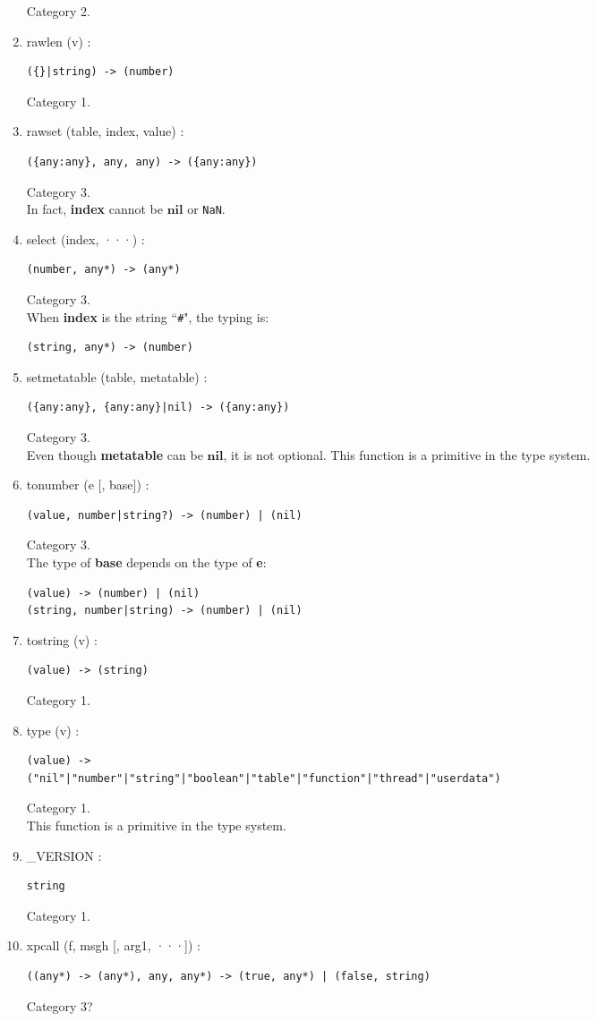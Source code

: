 \documentclass{paper}
\newcommand{\Nil}{\mathbf{nil}}
\begin{document}
\begin{enumerate}
Category 2.
\item rawlen (v) :
\begin{verbatim}
({}|string) -> (number)
\end{verbatim}
Category 1.
\item rawset (table, index, value) :
\begin{verbatim}
({any:any}, any, any) -> ({any:any})
\end{verbatim}
Category 3.
\\
In fact, \textbf{index} cannot be $\Nil$ or \texttt{NaN}.
\item select (index, ···) :
\begin{verbatim}
(number, any*) -> (any*)
\end{verbatim}
Category 3.
\\
When \textbf{index} is the string ``\texttt{\#}", the typing is:
\begin{verbatim}
(string, any*) -> (number)
\end{verbatim}
\item setmetatable (table, metatable) :
\begin{verbatim}
({any:any}, {any:any}|nil) -> ({any:any}) 
\end{verbatim}
Category 3.
\\
Even though \textbf{metatable} can be $\Nil$, it is not optional.
This function is a primitive in the type system.
\item tonumber (e [, base]) :
\begin{verbatim}
(value, number|string?) -> (number) | (nil)
\end{verbatim}
Category 3.
\\
The type of \textbf{base} depends on the type of \textbf{e}:
\begin{verbatim}
(value) -> (number) | (nil)
(string, number|string) -> (number) | (nil)
\end{verbatim}
\item tostring (v) :
\begin{verbatim}
(value) -> (string)
\end{verbatim}
Category 1.
\item type (v) :
\begin{verbatim}
(value) ->
("nil"|"number"|"string"|"boolean"|"table"|"function"|"thread"|"userdata")
\end{verbatim}
Category 1.
\\
This function is a primitive in the type system.
\item \_VERSION :
\begin{verbatim}
string
\end{verbatim}
Category 1.
\item xpcall (f, msgh [, arg1, ···]) :
\begin{verbatim}
((any*) -> (any*), any, any*) -> (true, any*) | (false, string)
\end{verbatim}
Category 3?
\end{enumerate}
\end{document}
